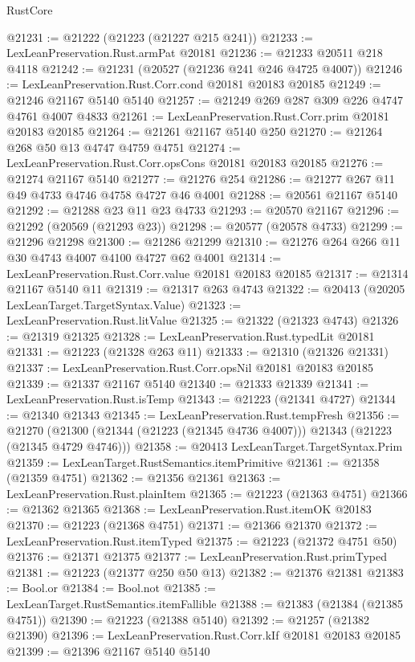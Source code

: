 \begin{lexlean}{RustCore}
\begin{coremodule}
@21231 := @21222 (@21223 (@21227 @215 @241))
@21233 := LexLeanPreservation.Rust.armPat @20181
@21236 := @21233 @20511 @218 @4118
@21242 := @21231 (@20527 (@21236 @241 @246 @4725 @4007))
@21246 := LexLeanPreservation.Rust.Corr.cond @20181 @20183 @20185
@21249 := @21246 @21167 @5140 @5140
@21257 := @21249 @269 @287 @309 @226 @4747 @4761 @4007 @4833
@21261 := LexLeanPreservation.Rust.Corr.prim @20181 @20183 @20185
@21264 := @21261 @21167 @5140 @250
@21270 := @21264 @268 @50 @13 @4747 @4759 @4751
@21274 := LexLeanPreservation.Rust.Corr.opsCons @20181 @20183 @20185
@21276 := @21274 @21167 @5140
@21277 := @21276 @254
@21286 := @21277 @267 @11 @49 @4733 @4746 @4758 @4727 @46 @4001
@21288 := @20561 @21167 @5140
@21292 := @21288 @23 @11 @23 @4733
@21293 := @20570 @21167
@21296 := @21292 (@20569 (@21293 @23))
@21298 := @20577 (@20578 @4733)
@21299 := @21296 @21298
@21300 := @21286 @21299
@21310 := @21276 @264 @266 @11 @30 @4743 @4007 @4100 @4727 @62 @4001
@21314 := LexLeanPreservation.Rust.Corr.value @20181 @20183 @20185
@21317 := @21314 @21167 @5140 @11
@21319 := @21317 @263 @4743
@21322 := @20413 (@20205 LexLeanTarget.TargetSyntax.Value)
@21323 := LexLeanPreservation.Rust.litValue
@21325 := @21322 (@21323 @4743)
@21326 := @21319 @21325
@21328 := LexLeanPreservation.Rust.typedLit @20181
@21331 := @21223 (@21328 @263 @11)
@21333 := @21310 (@21326 @21331)
@21337 := LexLeanPreservation.Rust.Corr.opsNil @20181 @20183 @20185
@21339 := @21337 @21167 @5140
@21340 := @21333 @21339
@21341 := LexLeanPreservation.Rust.isTemp
@21343 := @21223 (@21341 @4727)
@21344 := @21340 @21343
@21345 := LexLeanPreservation.Rust.tempFresh
@21356 := @21270
    (@21300 (@21344 (@21223 (@21345 @4736 @4007))) @21343 (@21223 (@21345 @4729 @4746)))
@21358 := @20413 LexLeanTarget.TargetSyntax.Prim
@21359 := LexLeanTarget.RustSemantics.itemPrimitive
@21361 := @21358 (@21359 @4751)
@21362 := @21356 @21361
@21363 := LexLeanPreservation.Rust.plainItem
@21365 := @21223 (@21363 @4751)
@21366 := @21362 @21365
@21368 := LexLeanPreservation.Rust.itemOK @20183
@21370 := @21223 (@21368 @4751)
@21371 := @21366 @21370
@21372 := LexLeanPreservation.Rust.itemTyped
@21375 := @21223 (@21372 @4751 @50)
@21376 := @21371 @21375
@21377 := LexLeanPreservation.Rust.primTyped
@21381 := @21223 (@21377 @250 @50 @13)
@21382 := @21376 @21381
@21383 := Bool.or
@21384 := Bool.not
@21385 := LexLeanTarget.RustSemantics.itemFallible
@21388 := @21383 (@21384 (@21385 @4751))
@21390 := @21223 (@21388 @5140)
@21392 := @21257 (@21382 @21390)
@21396 := LexLeanPreservation.Rust.Corr.kIf @20181 @20183 @20185
@21399 := @21396 @21167 @5140 @5140

\end{coremodule}
\end{lexlean}
